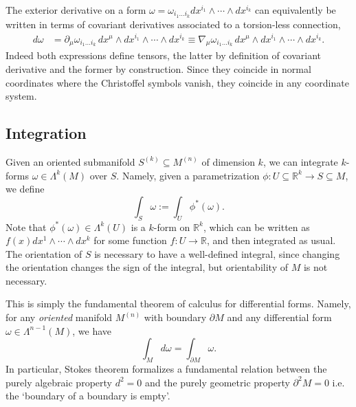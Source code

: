 \begin{mytheorem}
The exterior derivative on a form $\omega=\omega_{i_1 \dots i_k} dx^{i_1} \wedge \cdots \wedge dx^{i_k}$ can equivalently be written in terms of covariant derivatives associated to a torsion-less connection,
\begin{align}
    d\omega &= \partial_\mu \omega_{i_1 \dots i_k} \, dx^{\mu} \wedge dx^{i_1} \wedge \cdots \wedge dx^{i_k}
    \equiv
    \nabla_\mu \omega_{i_1 \dots i_k} \, dx^{\mu} \wedge dx^{i_1} \wedge \cdots \wedge dx^{i_k}.
\end{align}
Indeed both expressions define tensors, the latter by definition of covariant derivative and the former by construction.
Since they coincide in normal coordinates where the Christoffel symbols vanish, they coincide in any coordinate system.
%
\end{mytheorem}


\subsection{Integration} 

\begin{mytheorem}
Given an oriented submanifold $S^{(k)} \subseteq M^{(n)}$ of dimension $k$, we can integrate $k$-forms $\omega \in \Lambda^k (M)$ over $S$.
Namely, given a parametrization $\phi: U \subseteq \mathbb{R}^k \to S \subseteq M$, we define
\begin{equation}
    \int_S \omega := \int_U \phi^* (\omega).
\end{equation}
Note that $\phi^* (\omega) \in \Lambda^k (U)$ is a $k$-form on $\mathbb{R}^k$, which can be written as $f(x) dx^1 \wedge \cdots \wedge dx^k$ for some function $f: U \to \mathbb{R}$, and then integrated as usual.
The orientation of $S$ is necessary to have a well-defined integral, since changing the orientation changes the sign of the integral, but orientability of $M$ is not necessary.
\end{mytheorem}

\begin{mytheorem}
This is simply the fundamental theorem of calculus for differential forms.
Namely, for any \emph{oriented} manifold $M^{(n)}$ with boundary $\partial M$ and any differential form $\omega \in \Lambda^{n-1} (M)$, we have
\begin{equation}
    \int_M d\omega = \int_{\partial M} \omega.
\end{equation}
In particular, Stokes theorem formalizes a fundamental relation between the purely algebraic property $d^2 = 0$ and the purely geometric property $\partial ^2 M =0$ i.e. the `boundary of a boundary is empty'.
\end{mytheorem}


